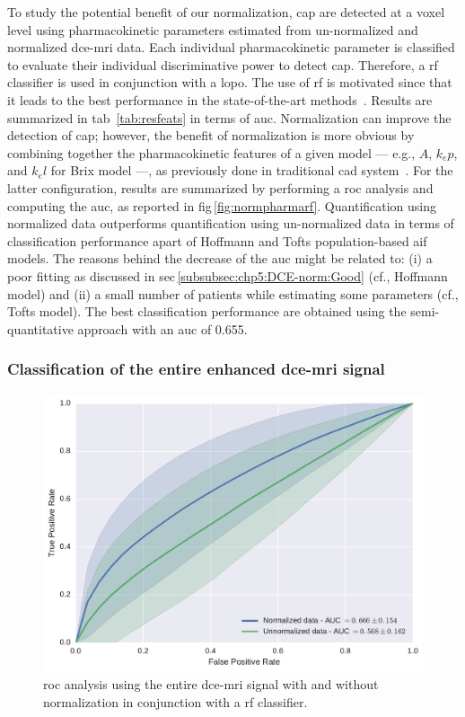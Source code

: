 To study the potential benefit of our normalization, \ac{cap} are detected at a voxel level using pharmacokinetic parameters estimated from un-normalized and normalized \ac{dce}-\ac{mri} data.
Each individual pharmacokinetic parameter is classified to evaluate their individual discriminative power to detect \ac{cap}.
Therefore, a \ac{rf} classifier is used in conjunction with a \ac{lopo}.
The use of \ac{rf} is motivated since that it leads to the best performance in the state-of-the-art methods~\cite{Litjens2014,Lemaitre2015}.
Results are summarized in \acs{tab}~\ref{tab:resfeats} in terms of \ac{auc}.
Normalization can improve the detection of \ac{cap}; however, the benefit of normalization is more obvious by combining together the pharmacokinetic features of a given model --- e.g., $A$, $k_ep$, and $k_el$ for Brix model ---, as previously done in traditional \ac{cad} system~\cite{Lemaitre2015}.
For the latter configuration, results are summarized by performing a \ac{roc} analysis and computing the \ac{auc}, as reported in \acs{fig}\,\ref{fig:normpharmarf}.
Quantification using normalized data outperforms quantification using un-normalized data in terms of classification performance apart of Hoffmann and Tofts population-based \ac{aif} models.
The reasons behind the decrease of the \ac{auc} might be related to: (i) a poor fitting as discussed in \acs{sec}\,\ref{subsubsec:chp5:DCE-norm:Good} (cf., Hoffmann model) and (ii) a small number of patients while estimating some parameters (cf., Tofts model).
The best classification performance are obtained using the semi-quantitative approach with an \ac{auc} of 0.655.

\subsubsection{Classification of the entire enhanced \acs*{dce}-\acs*{mri} signal} \label{subsubsec:chp5:DCE-norm:class}

\begin{figure}
  \centering
  \includegraphics[width=0.7\linewidth]{5_normalization/figures/DCE-normalization/full_signal_0.pdf}
  \caption{\acs*{roc} analysis using the entire \acs*{dce}-\acs*{mri} signal with and without normalization in conjunction with a \acs*{rf} classifier.}
  \label{fig:rfnormdcesignal}
\end{figure}

